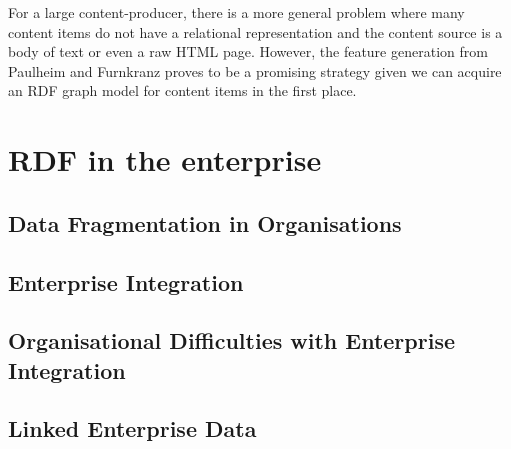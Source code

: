 For a large content-producer, there is a more general problem where many content
items do not have a relational representation and the content source is a body
of text or even a raw HTML page. However, the feature generation from Paulheim
and F\:urnkranz proves to be a promising strategy given we can acquire an RDF
graph model for content items in the first place.

\section{RDF in the enterprise}
\label{sec:linked-enterprise-data}

\subsection{Data Fragmentation in Organisations}
\subsection{Enterprise Integration}
\subsection{Organisational Difficulties with Enterprise Integration}
\label{sec:ei-difficulties}
\subsection{Linked Enterprise Data}
